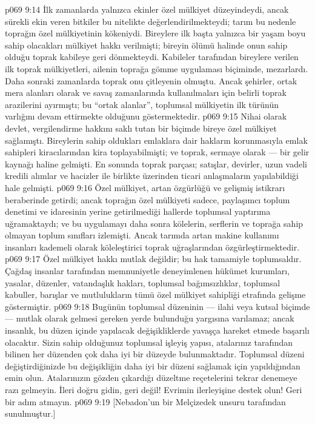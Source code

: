 \vs p069 9:14 İlk zamanlarda yalnızca ekinler özel mülkiyet düzeyindeydi, ancak sürekli ekin veren bitkiler bu nitelikte değerlendirilmekteydi; tarım bu nedenle toprağın özel mülkiyetinin kökeniydi. Bireylere ilk başta yalnızca bir yaşam boyu sahip olacakları mülkiyet hakkı verilmişti; bireyin ölümü halinde onun sahip olduğu toprak kabileye geri dönmekteydi. Kabileler tarafından bireylere verilen ilk toprak mülkiyetleri, ailenin toprağa gömme uygulaması biçiminde, mezarlardı. Daha sonraki zamanlarda toprak onu çitleyenin olmuştu. Ancak şehirler, ortak mera alanları olarak ve savaş zamanlarında kullanılmaları için belirli toprak arazilerini ayırmıştı; bu “ortak alanlar”, toplumsal mülkiyetin ilk türünün varlığını devam ettirmekte olduğunu göstermektedir.
\vs p069 9:15 Nihai olarak devlet, vergilendirme hakkını saklı tutan bir biçimde bireye özel mülkiyet sağlamıştı. Bireylerin sahip oldukları emlaklara dair hakların korunmasıyla emlak sahipleri kiracılarından kira toplayabilmişti; ve toprak, sermaye olarak --- bir gelir kaynağı haline gelmişti. En sonunda toprak parçası; satışlar, devirler, uzun vadeli kredili alımlar ve hacizler ile birlikte üzerinden ticari anlaşmaların yapılabildiği hale gelmişti.
\vs p069 9:16 Özel mülkiyet, artan özgürlüğü ve gelişmiş istikrarı beraberinde getirdi; ancak toprağın özel mülkiyeti sadece, paylaşımcı toplum denetimi ve idaresinin yerine getirilmediği hallerde toplumsal yaptırıma uğramaktaydı; ve bu uygulamayı daha sonra kölelerin, serflerin ve toprağa sahip olmayan toplum sınıfları izlemişti. Ancak tarımda artan makine kullanımı insanları kademeli olarak köleleştirici toprak uğraşlarından özgürleştirmektedir.
\vs p069 9:17 Özel mülkiyet hakkı mutlak değildir; bu hak tamamiyle toplumsaldır. Çağdaş insanlar tarafından memnuniyetle deneyimlenen hükümet kurumları, yasalar, düzenler, vatandaşlık hakları, toplumsal bağımsızlıklar, toplumsal kabuller, barışlar ve mutlulukların tümü özel mülkiyet sahipliği etrafında gelişme göstermiştir.
\vs p069 9:18 Bugünün toplumsal düzeninin --- ilahi veya kutsal biçimde --- mutlak olarak gelmesi gereken yerde bulunduğu yargısına varılamaz; ancak insanlık, bu düzen içinde yapılacak değişikliklerde yavaşça hareket etmede başarılı olacaktır. Sizin sahip olduğunuz toplumsal işleyiş yapısı, atalarınız tarafından bilinen her düzenden çok daha iyi bir düzeyde bulunmaktadır. Toplumsal düzeni değiştirdiğinizde bu değişikliğin daha iyi bir düzeni sağlamak için yapıldığından emin olun. Atalarınızın gözden çıkardığı düzeltme reçetelerini tekrar denemeye razı gelmeyin. İleri doğru gidin, geri değil! Evrimin ilerleyişine destek olun! Geri bir adım atmayın.
\vs p069 9:19 [Nebadon’un bir Melçizedek unsuru tarafından sunulmuştur.]
